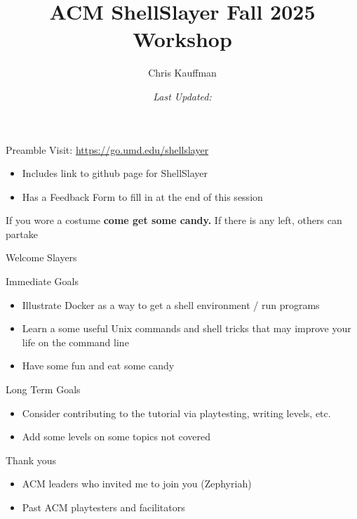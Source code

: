 \documentclass[mathserif]{beamer}
\author{Chris Kauffman}
\date{\it Last Updated: \newline }
\title{ACM ShellSlayer Fall 2025 Workshop}
\begin{document}
\maketitle
\begin{frame}[label={sec:org6b871c7}]{Preamble}
Visit: \url{https://go.umd.edu/shellslayer}
\begin{itemize}
\item Includes link to github page for ShellSlayer
\item Has a Feedback Form to fill in at the end of this session
\end{itemize}

If you wore a costume \textbf{come get some candy.}  If there is any left,
others can partake
\end{frame}
\begin{frame}[label={sec:org1fb85a2}]{Welcome Slayers}
\begin{block}{Immediate Goals}
\begin{itemize}
\item Illustrate Docker as a way to get a shell environment / run programs
\item Learn a some useful Unix commands and shell tricks that may improve
your life on the command line
\item Have some fun and eat some candy
\end{itemize}
\end{block}
\begin{block}{Long Term Goals}
\begin{itemize}
\item Consider contributing to the tutorial via playtesting, writing
levels, etc.
\item Add some levels on some topics not covered
\end{itemize}
\end{block}
\begin{block}{Thank yous}
\begin{itemize}
\item ACM leaders who invited me to join you (Zephyriah)
\item Past ACM playtesters and facilitators
\end{itemize}
\end{block}
\end{frame}
\end{document}
